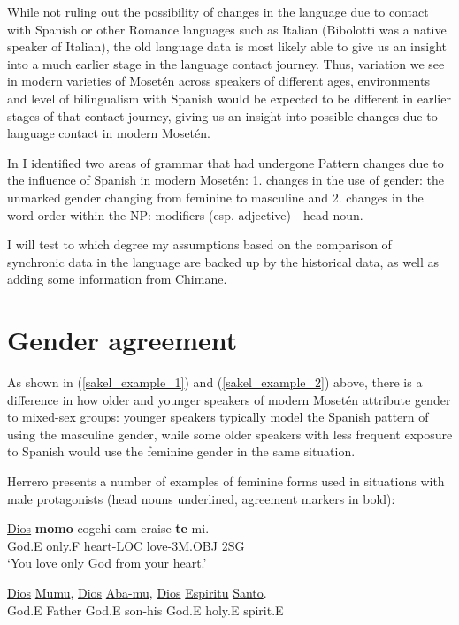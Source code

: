 \documentclass[output=paper,colorlinks,citecolor=brown
]{langscibook}
\begin{document}
While not ruling out the possibility of changes in the language due to contact with Spanish or other Romance languages such as Italian (Bibolotti was a native speaker of Italian), the old language data is most likely able to give us an insight into a much earlier stage in the language contact journey. Thus, variation we see in modern varieties of Mosetén across speakers of different ages, environments and level of bilingualism with Spanish would be expected to be different in earlier stages of that contact journey, giving us an insight into possible changes due to language contact in modern Mosetén.

In \citep{sakel2007moseten} I identified two areas of grammar that had undergone Pattern changes due to the influence of Spanish in modern Mosetén: 1. changes in the use of gender: the unmarked gender changing from feminine to masculine and 2. changes in the word order within the NP: modifiers (esp. adjective) - head noun.

I will test to which degree my assumptions based on the comparison of synchronic data in the language are backed up by the historical data, as well as adding some information from Chimane.

\section{Gender agreement}
As shown in (\ref{sakel_example_1}) and (\ref{sakel_example_2}) above, there is a difference in how older and younger speakers of modern Mosetén attribute gender to mixed-sex groups: younger speakers typically model the Spanish pattern of using the masculine gender, while some older speakers with less frequent exposure to Spanish would use the feminine gender in the same situation. 

Herrero  presents a number of examples of feminine forms used in situations with male protagonists (head nouns underlined, agreement markers in bold):

\ea \label{sakel_example_6}
\gll \underline{Dios} 	\textbf{momo}	cogchi-cam 	eraise-\textbf{te} 	mi.\\
     God.E	only.F	heart-LOC	love-3M.OBJ	2SG\\
\glt ‘You love only God from your heart.’
\z

\ea \label{sakel_example_7}
\gll \underline{Dios} \underline{Mumu}, 	\underline{Dios} \underline{Aba-mu},	\underline{Dios} \underline{Espiritu} \underline{Santo}.\\
     God.E Father	God.E son-his	God.E holy.E spirit.E\\
     
\end{document}

